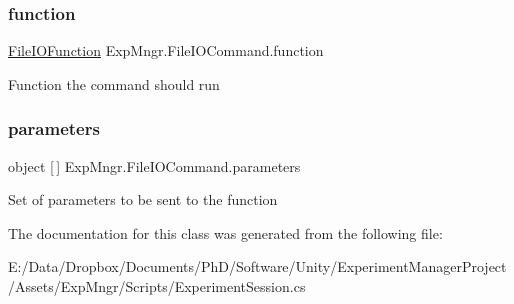 \subsubsection{\texorpdfstring{function}{function}}
{\footnotesize\ttfamily \hyperlink{namespace_exp_mngr_ada658a3bceadc7d2f4be3a749edae819}{File\+I\+O\+Function} Exp\+Mngr.\+File\+I\+O\+Command.\+function}



Function the command should run 

\mbox{\label{class_exp_mngr_1_1_file_i_o_command_aa04302d7d0a41caee878d940ef4408ce}} 
\subsubsection{\texorpdfstring{parameters}{parameters}}
{\footnotesize\ttfamily object \mbox{[}$\,$\mbox{]} Exp\+Mngr.\+File\+I\+O\+Command.\+parameters}



Set of parameters to be sent to the function 



The documentation for this class was generated from the following file\+:\begin{DoxyCompactItemize}
\item 
E\+:/\+Data/\+Dropbox/\+Documents/\+Ph\+D/\+Software/\+Unity/\+Experiment\+Manager\+Project/\+Assets/\+Exp\+Mngr/\+Scripts/Experiment\+Session.\+cs\end{DoxyCompactItemize}
